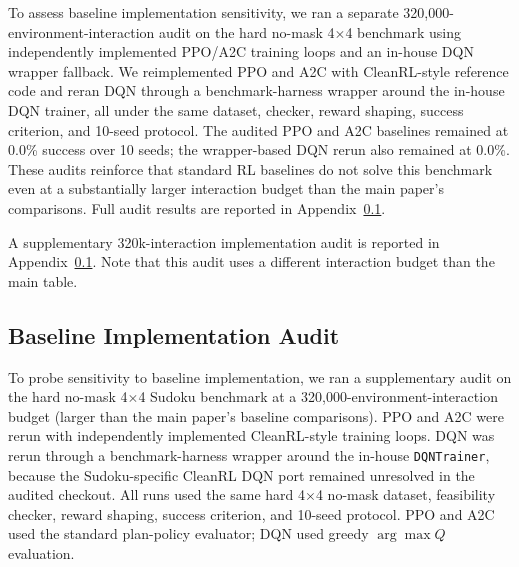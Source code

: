 %

To assess baseline implementation sensitivity, we ran a separate
320{,}000-environment-interaction audit on the hard no-mask 4$\times$4
benchmark using independently implemented PPO/A2C training loops and an
in-house DQN wrapper fallback. We reimplemented PPO and A2C with
CleanRL-style reference code and reran DQN through a benchmark-harness
wrapper around the in-house DQN trainer,
all under the same dataset, checker, reward shaping, success criterion,
and 10-seed protocol. The audited PPO and A2C baselines remained at
0.0\% success over 10 seeds; the wrapper-based DQN rerun also remained
at 0.0\%. These audits reinforce that standard RL baselines do not solve
this benchmark even at a substantially larger interaction budget than the
main paper's comparisons. Full audit results are reported in
Appendix~\ref{app:baseline-audit}.

A supplementary 320k-interaction implementation audit is reported in
Appendix~\ref{app:baseline-audit}. Note that this audit uses a different
interaction budget than the main table.

\subsection{Baseline Implementation Audit}
\label{app:baseline-audit}

To probe sensitivity to baseline implementation, we ran a supplementary
audit on the hard no-mask 4$\times$4 Sudoku benchmark at a
320{,}000-environment-interaction budget (larger than the main paper's
baseline comparisons). PPO and A2C were rerun with independently
implemented CleanRL-style training loops. DQN was rerun through a
benchmark-harness wrapper around the in-house \texttt{DQNTrainer},
because the Sudoku-specific CleanRL DQN port remained unresolved in the
audited checkout. All runs used the same hard 4$\times$4 no-mask dataset,
feasibility checker, reward shaping, success criterion, and 10-seed
protocol. PPO and A2C used the standard plan-policy evaluator; DQN used
greedy $\arg\max Q$ evaluation.

